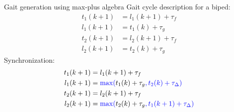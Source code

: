 \documentclass{beamer}
\renewcommand{\cite}[1]{\footnote<.->[frame]{\fullcite{#1}}}
\begin{document}

\begin{frame}{Gait generation using max-plus algebra}
	Gait cycle description for a biped:
	\begin{align*}
			t_1 (k+1) &= l_1 (k+1) + \tau_f \\
			l_1 (k+1) &= t_1 (k) + \tau_g \\
			t_2 (k+1) &= l_2 (k+1) + \tau_f \\
			l_2 (k+1) &= t_2 (k) + \tau_g
	\end{align*}
	Synchronization:
	\begin{align*}
			t_1 (k+1) &= l_1 (k+1) + \tau_f \\
			l_1 (k+1) &= \color{blue}\max (\color{black}t_1 (k) + \tau_g\color{blue},t_2(k) + \tau_\Delta)\\
			t_2 (k+1) &= l_2 (k+1) + \tau_f \\
			l_2 (k+1) &= \color{blue}\max (\color{black}t_2 (k) + \tau_g\color{blue},t_1(k+1) + \tau_\Delta)
		\end{align*}
\end{frame}
\end{document}
